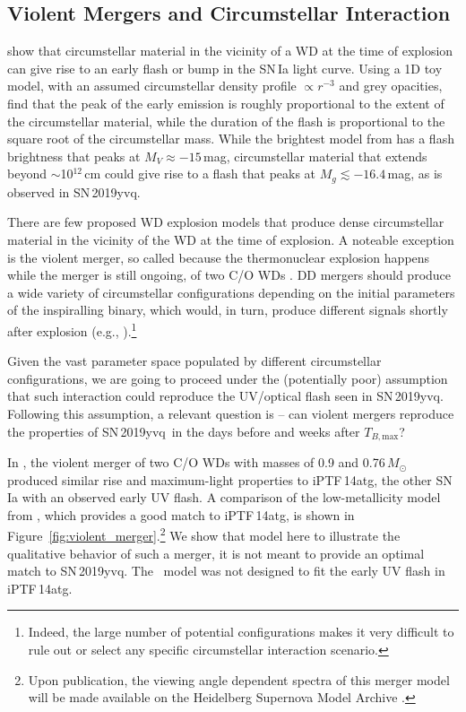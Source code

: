 \documentclass[twocolumn]{aastex63}
\newcommand{\tbmax}{$T_{B,\mathrm{max}}$}
\newcommand{\sn}{SN\,2019yvq}
\begin{document}
\subsection{Violent Mergers and Circumstellar
Interaction}\label{sec:merger_csm}

\citet{Piro16} show that circumstellar material in the vicinity of a WD at the
time of explosion can give rise to an early flash or bump in the SN\,Ia light
curve. Using a 1D toy model, with an assumed circumstellar density profile
$\propto r^{-3}$ and grey opacities, \citet{Piro16} find that the peak of the
early emission is roughly proportional to the extent of the circumstellar
material, while the duration of the flash is proportional to the square root
of the circumstellar mass. While the brightest model from \citet{Piro16} has a
flash brightness that peaks at $M_V \approx -15$\,mag, circumstellar material
that extends beyond $\sim$10$^{12}$\,cm could give rise to a flash that peaks
at $M_g \lesssim -16.4$\,mag, as is observed in \sn.

There are few proposed WD explosion models that produce dense circumstellar
material in the vicinity of the WD at the time of explosion. A noteable
exception is the violent merger, so called because the thermonuclear explosion
happens while the merger is still ongoing, of two C/O WDs
\citep{Pakmor10,Pakmor11,Pakmor12}. DD mergers should produce a wide variety
of circumstellar configurations depending on the initial parameters of the
inspiralling binary, which would, in turn, produce different signals shortly
after explosion (e.g., \citealt{Raskin13,Levanon19}).\footnote{Indeed, the
large number of potential configurations makes it very difficult to rule out
or select any specific circumstellar interaction scenario.}

Given the vast parameter space populated by different circumstellar
configurations, we are going to proceed under the (potentially poor)
assumption that such interaction could reproduce the UV/optical flash seen in
\sn. Following this assumption, a relevant question is -- can violent mergers
reproduce the properties of \sn\ in the days before and weeks after \tbmax?

In \citet{Kromer16}, the violent merger of two C/O WDs with masses of 0.9 and
0.76\,$M_\odot$ produced similar rise and maximum-light properties to
iPTF\,14atg, the other SN\,Ia with an observed early UV flash. A comparison of
the low-metallicity model from \citet{Kromer16}, which provides a good match
to iPTF\,14atg, is shown in Figure~\ref{fig:violent_merger}.\footnote{Upon
publication, the viewing angle dependent spectra of this merger model will be
made available on the Heidelberg Supernova Model Archive
\citep[HESMA,][]{Kromer17}.} We show that model here to illustrate the
qualitative behavior of such a merger, it is not meant to provide an optimal
match to \sn. The \citeauthor{Kromer16}~model was not designed to fit the
early UV flash in iPTF\,14atg.
\end{document}
